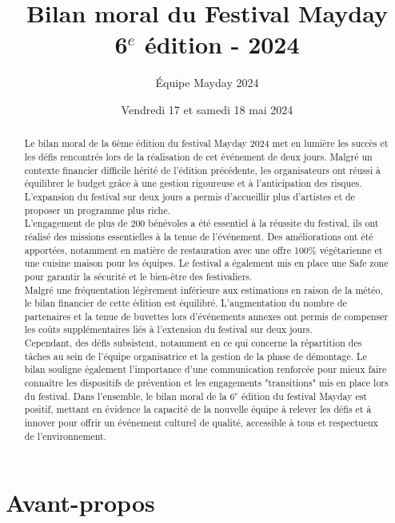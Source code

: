 \documentclass[12pt,a4paper]{report}
\title{Bilan moral du Festival Mayday \\ 6$^e$ édition - 2024}
\author{Équipe Mayday 2024}
\date{Vendredi 17 et samedi 18 mai 2024}
\begin{document}
\maketitle

\begin{abstract} %
Le bilan moral de la 6ème édition du festival Mayday 2024 met en lumière les succès et les défis rencontrés lors de la réalisation de cet événement de deux jours. Malgré un contexte financier difficile hérité de l’édition précédente, les organisateurs ont réussi à équilibrer le budget grâce à une gestion rigoureuse et à l’anticipation des risques. L’expansion du festival sur deux jours a permis d’accueillir plus d’artistes et de proposer un programme plus riche.\\

L’engagement de plus de 200 bénévoles a été essentiel à la réussite du festival, ils ont réalisé des missions essentielles à la tenue de l'événement. Des améliorations ont été apportées, notamment en matière de restauration avec une offre 100\% végétarienne et une cuisine maison pour les équipes. Le festival a également mis en place une \og Safe zone \fg{} pour garantir la sécurité et le bien-être des festivaliers.\\

Malgré une fréquentation légèrement inférieure aux estimations en raison de la météo, le bilan financier de cette édition est équilibré. L’augmentation du nombre de partenaires et la tenue de buvettes lors d'événements annexes ont permis de compenser les coûts supplémentaires liés à l’extension du festival sur deux jours.\\

Cependant, des défis subsistent, notamment en ce qui concerne la répartition des tâches au sein de l’équipe organisatrice et la gestion de la phase de démontage. Le bilan souligne également l’importance d’une communication renforcée pour mieux faire connaître les dispositifs de prévention et les engagements "transitions" mis en place lors du festival. Dans l’ensemble, le bilan moral de la 6$^e$ édition du festival Mayday est positif, mettant en évidence la capacité de la nouvelle équipe à relever les défis et à innover pour offrir un événement culturel de qualité, accessible à tous et respectueux de l’environnement.
\end{abstract}

\tableofcontents

\newpage

\section*{Avant-propos}
\end{document}

